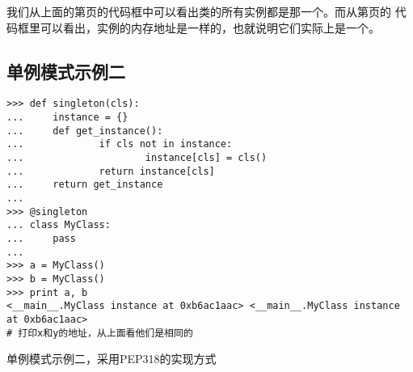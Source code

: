 \documentclass{article}
\begin{document}
我们从上面的第\pageref{normalClass}页的代码框中可以看出类的所有实例都是那一个。而从第\pageref{singleton}页的
代码框里可以看出，实例的内存地址是一样的，也就说明它们实际上是一个。

\subsection{单例模式示例二}
\begin{listing}[H]
\begin{verbatim}
>>> def singleton(cls):
...     instance = {}
...     def get_instance():
...             if cls not in instance:
...                     instance[cls] = cls()
...             return instance[cls]
...     return get_instance
... 
>>> @singleton
... class MyClass:
...     pass
... 
>>> a = MyClass()
>>> b = MyClass()
>>> print a, b
<__main__.MyClass instance at 0xb6ac1aac> <__main__.MyClass instance at 0xb6ac1aac>
# 打印x和y的地址，从上面看他们是相同的
\end{verbatim}
\label{singleton2}
\caption{单例模式示例二，采用PEP318的实现方式}
\end{listing}
\end{document}
